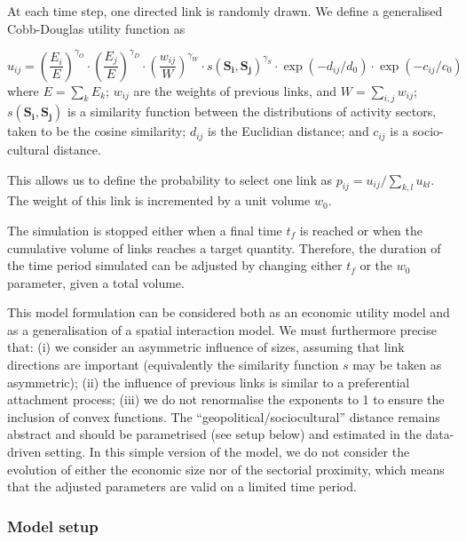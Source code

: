 \documentclass[10pt,letterpaper]{article}
\begin{document}
At each time step, one directed link is randomly drawn. We define a generalised Cobb-Douglas utility function \cite{vilcu2011geometric} as 

\begin{equation}
u_{ij} = \left(\frac{E_{i}}{E}\right)^{\gamma_O} \cdot \left(\frac{E_{j}}{E}\right)^{\gamma_D} \cdot \left(\frac{w_{ij}}{W}\right)^{\gamma_W} \cdot s\left(\mathbf{S_{i}},\mathbf{S_{j}}\right)^{\gamma_S} \cdot \exp \left(- d_{ij} / d_0\right) \cdot \exp \left(- c_{ij} / c_0\right)
\end{equation}
where $E  =  \sum_k E_k$; $w_{ij}$ are the weights of previous links, and $W  = \sum_{i,j} w_{ij}$; $s(\mathbf{S_{i}},\mathbf{S_{j}})$ is a similarity function between the distributions of activity sectors, taken to be the cosine similarity; $d_{ij}$ is the Euclidian distance; and $c_{ij}$ is a socio-cultural distance.

This allows us to define the probability to select one link as $p_{ij} = u_{ij} / \sum_{k,l} u_{kl}$. The weight of this link is incremented by a unit volume $w_0$.

The simulation is stopped either when a final time $t_f$ is reached or when the cumulative volume of links reaches a target quantity. Therefore, the duration of the time period simulated can be adjusted by changing either $t_f$ or the $w_0$ parameter, given a total volume. 



This model formulation can be considered both as an economic utility model and as a generalisation of a spatial interaction model. We must furthermore precise that: (i) we consider an asymmetric influence of sizes, assuming that link directions are important (equivalently the similarity function $s$ may be taken as asymmetric); (ii) the influence of previous links is similar to a preferential attachment process; (iii) we do not renormalise the exponents to 1 to ensure the inclusion of convex functions. The ``geopolitical/sociocultural'' distance remains abstract and should be parametrised (see setup below) and estimated in the data-driven setting. In this simple version of the model, we do not consider the evolution of either the economic size nor of the sectorial proximity, which means that the adjusted parameters are valid on a limited time period.


\subsubsection*{Model setup}
\end{document}
